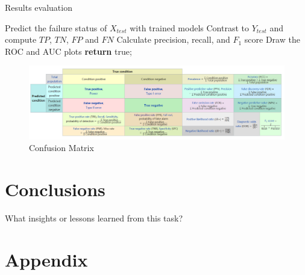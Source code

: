 \documentclass[12pt,a4paper,english]{amsart}
\begin{document}

\begin{algorithm}  
	\caption{Results evaluation}
	\LinesNumbered  
	Predict the failure status of $X_{test}$ with trained models\;
	Contrast to $Y_{test}$ and compute $TP$, $TN$, $FP$ and $FN$\;
	Calculate precision, recall, and $F_1$ score\;
	Draw the ROC and AUC plots\;
	\textbf{return} true;
\end{algorithm}

\begin{figure}[htb]
	\centering
	\includegraphics[width=\textwidth]{img/auc.PNG}
	\caption{Confusion Matrix\cite{Wiki}}
\end{figure}
%
\section{Conclusions}

What insights or lessons learned from this task?
\cite{Ren2018a}



\newpage

\section*{Appendix}
\end{document}
